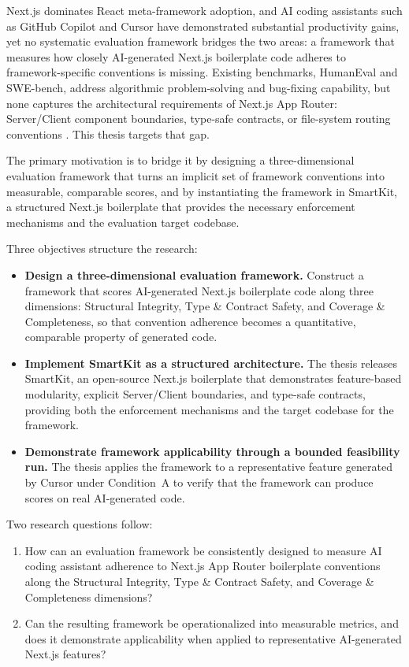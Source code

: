 \documentclass[12pt,a4paper]{report}
\begin{document}
Next.js dominates React meta-framework adoption, and AI coding assistants such as GitHub Copilot and Cursor have demonstrated substantial productivity gains, yet no systematic evaluation framework bridges the two areas: a framework that measures how closely AI-generated Next.js boilerplate code adheres to framework-specific conventions is missing. Existing benchmarks, HumanEval and SWE-bench, address algorithmic problem-solving and bug-fixing capability, but none captures the architectural requirements of Next.js App Router: Server/Client component boundaries, type-safe contracts, or file-system routing conventions \parencite{chen2021evaluating,jimenez2024swebench}. This thesis targets that gap.

The primary motivation is to bridge it by designing a three-dimensional evaluation framework that turns an implicit set of framework conventions into measurable, comparable scores, and by instantiating the framework in SmartKit, a structured Next.js boilerplate that provides the necessary enforcement mechanisms and the evaluation target codebase.

Three objectives structure the research:
{\sloppy
\begin{itemize}
    \item \textbf{Design a three-dimensional evaluation framework.}
    Construct a framework that scores AI-generated Next.js boilerplate
    code along three dimensions: Structural Integrity, Type \& Contract Safety, and
    Coverage \& Completeness, so that convention adherence becomes a quantitative,
    comparable property of generated code.
    \item \textbf{Implement SmartKit as a structured architecture.}
    The thesis releases SmartKit, an open-source Next.js boilerplate
    that demonstrates feature-based modularity, explicit Server/Client
    boundaries, and type-safe contracts, providing both the enforcement
    mechanisms and the target codebase for the framework.
    \item \textbf{Demonstrate framework applicability through a bounded
    feasibility run.} The thesis applies the framework to a representative
    feature generated by Cursor under Condition~A to verify that
    the framework can produce scores on real AI-generated code.
\end{itemize}
}

Two research questions follow:
\begin{enumerate}
    \item How can an evaluation framework be consistently designed to
    measure AI coding assistant adherence to Next.js App Router boilerplate conventions along the Structural Integrity, Type \& Contract Safety, and
    Coverage \& Completeness dimensions?
    \item Can the resulting framework be operationalized into measurable
    metrics, and does it demonstrate applicability when applied to
    representative AI-generated Next.js features?
\end{enumerate}
\end{document}
